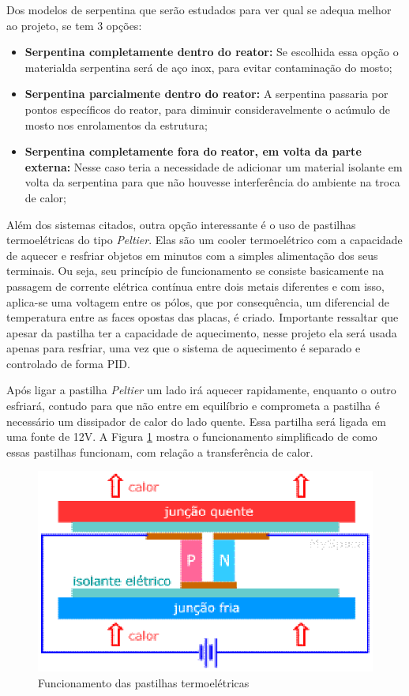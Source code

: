 Dos modelos de serpentina que serão estudados para ver qual se adequa melhor ao projeto, se tem 3 opções:

\begin{itemize}
  \item \textbf{Serpentina completamente dentro do reator:} Se escolhida essa opção o materialda serpentina será de aço inox, para evitar contaminação do mosto;
  \item \textbf{Serpentina parcialmente dentro do reator:} A serpentina passaria por pontos específicos do reator, para diminuir consideravelmente o acúmulo de mosto nos enrolamentos da estrutura;
  \item \textbf{Serpentina completamente fora do reator, em volta da parte externa:} Nesse caso teria a necessidade de adicionar um material isolante em volta da serpentina para que não houvesse interferência do ambiente na troca de calor;
\end{itemize}

Além dos sistemas citados, outra opção interessante é o uso de pastilhas termoelétricas do tipo \textit{Peltier}. Elas são um cooler termoelétrico com a capacidade de aquecer e resfriar objetos em minutos com a simples alimentação dos seus terminais. Ou seja, seu princípio de funcionamento se consiste basicamente na passagem de corrente elétrica contínua entre dois metais diferentes e com isso, aplica-se uma voltagem entre os pólos, que por consequência, um diferencial de temperatura entre as faces opostas das placas, é criado. Importante ressaltar que apesar da pastilha ter a capacidade de aquecimento, nesse projeto ela será usada apenas para resfriar, uma vez que o sistema de aquecimento é separado e controlado de forma PID.

Após ligar a pastilha \textit{Peltier} um lado irá aquecer rapidamente, enquanto o outro esfriará, contudo para que não entre em equilíbrio e comprometa a pastilha é necessário um dissipador de calor do lado quente. Essa partilha será ligada em uma fonte de 12V. A Figura \ref{pastilhas} mostra o funcionamento simplificado de como essas pastilhas funcionam, com relação a transferência de calor.

\begin{figure}[h]
	\centering
	\includegraphics[keepaspectratio=true,scale=0.6]{figuras/pastilhas.eps}
	\caption{Funcionamento das pastilhas termoelétricas}
	\label{pastilhas}
\end{figure}

